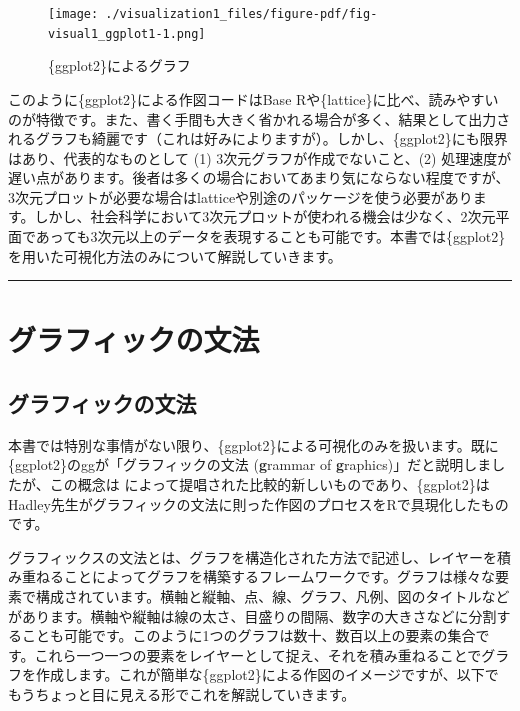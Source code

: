 \documentclass[
  a4paper,
  pandoc,
  ja=standard,
  jafont=haranoaji]{bxjsbook}
\begin{document}
\begin{figure}[H]

{\centering \texttt{[image: ./visualization1\_files/figure-pdf/fig-visual1\_ggplot1-1.png]}

}

\caption{\label{fig-visual1_ggplot1}\{ggplot2\}によるグラフ}

\end{figure}

このように\{ggplot2\}による作図コードはBase
Rや\{lattice\}に比べ、読みやすいのが特徴です。また、書く手間も大きく省かれる場合が多く、結果として出力されるグラフも綺麗です（これは好みによりますが）。しかし、\{ggplot2\}にも限界はあり、代表的なものとして
(1) 3次元グラフが作成でないこと、(2)
処理速度が遅い点があります。後者は多くの場合においてあまり気にならない程度ですが、3次元プロットが必要な場合はlatticeや別途のパッケージを使う必要があります。しかし、社会科学において3次元プロットが使われる機会は少なく、2次元平面であっても3次元以上のデータを表現することも可能です。本書では\{ggplot2\}を用いた可視化方法のみについて解説していきます。

\begin{center}\rule{0.5\linewidth}{0.5pt}\end{center}

\hypertarget{sec-visual1_ggplot}{%
\section{グラフィックの文法}\label{sec-visual1_ggplot}}

\hypertarget{ux30b0ux30e9ux30d5ux30a3ux30c3ux30afux306eux6587ux6cd5}{%
\subsection{グラフィックの文法}\label{ux30b0ux30e9ux30d5ux30a3ux30c3ux30afux306eux6587ux6cd5}}

本書では特別な事情がない限り、\{ggplot2\}による可視化のみを扱います。既に\{ggplot2\}のggが「グラフィックの文法
(\textbf{g}rammar of \textbf{g}raphics)」だと説明しましたが、この概念は
\citet{Wilkinson:2005}
によって提唱された比較的新しいものであり、\{ggplot2\}はHadley先生がグラフィックの文法に則った作図のプロセスをRで具現化したものです。

グラフィックスの文法とは、グラフを構造化された方法で記述し、レイヤーを積み重ねることによってグラフを構築するフレームワークです。グラフは様々な要素で構成されています。横軸と縦軸、点、線、グラフ、凡例、図のタイトルなどがあります。横軸や縦軸は線の太さ、目盛りの間隔、数字の大きさなどに分割することも可能です。このように1つのグラフは数十、数百以上の要素の集合です。これら一つ一つの要素をレイヤーとして捉え、それを積み重ねることでグラフを作成します。これが簡単な\{ggplot2\}による作図のイメージですが、以下でもうちょっと目に見える形でこれを解説していきます。
\end{document}
